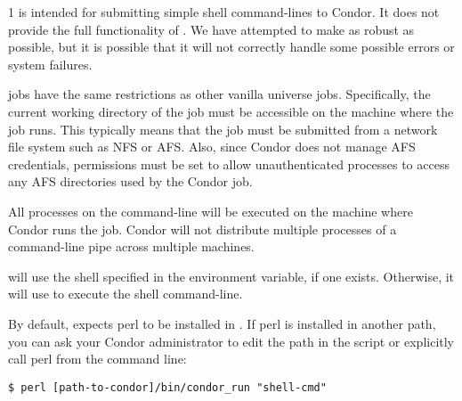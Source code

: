 \begin{ManPage}{\label{man-condor-run}}{1}
 is intended for submitting simple shell command-lines to
Condor.  It does not provide the full functionality of
.  We have attempted to make  as robust as
possible, but it is possible that it will not correctly handle some
possible  errors or system failures.

 jobs have the same restrictions as other vanilla universe
jobs.  Specifically, the current working directory of the job must be
accessible on the machine where the job runs.  This typically means
that the job must be submitted from a network file system such as NFS
or AFS.  Also, since Condor does not manage AFS credentials,
permissions must be set to allow unauthenticated processes to access
any AFS directories used by the Condor job.

All processes on the command-line will be executed on the machine
where Condor runs the job.  Condor will not distribute multiple
processes of a command-line pipe across multiple machines.

 will use the shell specified in the  environment
variable, if one exists.  Otherwise, it will use  to execute
the shell command-line.

By default,  expects perl to be installed in
.  If perl is installed in another path, you can
ask your Condor administrator to edit the path in the 
script or explicitly call perl from the command line:

\begin{verbatim}
$ perl [path-to-condor]/bin/condor_run "shell-cmd"
\end{verbatim}

\end{ManPage}
